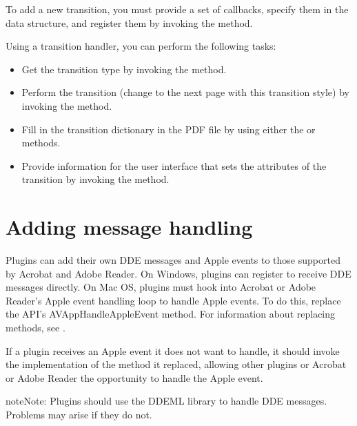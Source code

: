 \documentclass[letterpaper,12pt,english,openany,oneside]{sphinxmanual}
\begin{document}
To add a new transition, you must provide a set of callbacks, specify them in the  data structure, and register them by invoking the  method.

Using a transition handler, you can perform the following tasks:
\begin{itemize}
\item {} 
Get the transition type by invoking the  method.

\item {} 
Perform the transition (change to the next page with this transition style) by invoking the  method.

\item {} 
Fill in the transition dictionary in the PDF file by using either the  or  methods.

\item {} 
Provide information for the user interface that sets the attributes of the transition by invoking the  method.

\end{itemize}


\section{Adding message handling}
\label{\detokenize{Plugins_Handlers:adding-message-handling}}
Plugins can add their own DDE messages and Apple events to those supported by Acrobat and Adobe Reader. On Windows, plugins can register to receive DDE messages directly. On Mac OS, plugins must hook into Acrobat or Adobe Reader’s Apple event handling loop to handle Apple events. To do this, replace the API’s AVAppHandleAppleEvent method. For information about replacing methods, see .

If a plugin receives an Apple event it does not want to handle, it should invoke the implementation of the method it replaced, allowing other plugins or Acrobat or Adobe Reader the opportunity to handle the Apple event.

\begin{sphinxadmonition}{note}{Note:}
Plugins should use the DDEML library to handle DDE messages. Problems may arise if they do not.
\end{sphinxadmonition}
\end{document}
